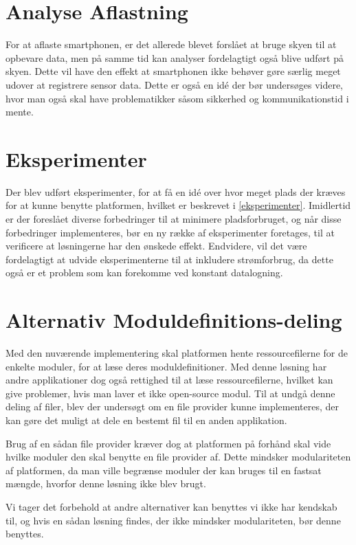 \section{Analyse Aflastning}
For at aflaste smartphonen, er det allerede blevet forslået at bruge skyen til at opbevare data, men på samme tid kan analyser fordelagtigt også blive udført på skyen. 
Dette vil have den effekt at smartphonen ikke behøver gøre særlig meget udover at registrere sensor data.
Dette er også en idé der bør undersøges videre, hvor man også skal have problematikker såsom sikkerhed og kommunikationstid i mente.

\section{Eksperimenter}
Der blev udført eksperimenter, for at få en idé over hvor meget plads der kræves for at kunne benytte platformen, hvilket er beskrevet i \cref{eksperimenter}.
Imidlertid er der foreslået diverse forbedringer til at minimere pladsforbruget, og når disse forbedringer implementeres, bør en ny række af eksperimenter foretages, til at verificere at løsningerne har den ønskede effekt.
Endvidere, vil det være fordelagtigt at udvide eksperimenterne til at inkludere strømforbrug, da dette også er et problem som kan forekomme ved konstant datalogning.

\section{Alternativ Moduldefinitions-deling}
Med den nuværende implementering skal platformen hente ressourcefilerne for de enkelte moduler, for at læse deres moduldefinitioner.
Med denne løsning har andre applikationer dog også rettighed til at læse ressourcefilerne, hvilket kan give problemer, hvis man laver et ikke open-source modul.
Til at undgå denne deling af filer, blev der undersøgt om en file provider kunne implementeres, der kan gøre det muligt at dele en bestemt fil til en anden applikation.

Brug af en sådan file provider kræver dog at platformen på forhånd skal vide hvilke moduler den skal benytte en file provider af.
Dette mindsker modulariteten af platformen, da man ville begrænse moduler der kan bruges til en fastsat mængde, hvorfor denne løsning ikke blev brugt.

Vi tager det forbehold at andre alternativer kan benyttes vi ikke har kendskab til, og hvis en sådan løsning findes, der ikke mindsker modulariteten, bør denne benyttes.

